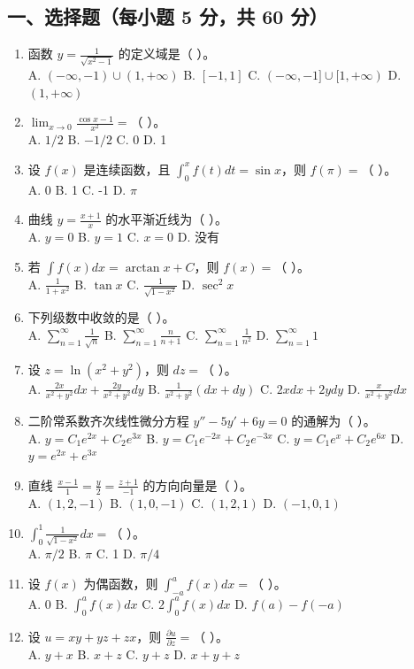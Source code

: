 \documentclass[11pt,a4paper]{article}
\begin{document}
\subsection*{一、选择题（每小题 5 分，共 60 分）}
\begin{enumerate}
    \item 函数 $y = \frac{1}{\sqrt{x^2-1}}$ 的定义域是（ ）。 \\
    A. $(-\infty, -1) \cup (1, +\infty)$ \quad B. $[-1, 1]$ \quad C. $(-\infty, -1] \cup [1, +\infty)$ \quad D. $(1, +\infty)$
    \item $\lim_{x \to 0} \frac{\cos x - 1}{x^2} = $（ ）。 \\
    A. $1/2$ \quad B. $-1/2$ \quad C. 0 \quad D. 1
    \item 设 $f(x)$ 是连续函数，且 $\int_0^x f(t) dt = \sin x$，则 $f(\pi) = $（ ）。 \\
    A. 0 \quad B. 1 \quad C. -1 \quad D. $\pi$
    \item 曲线 $y = \frac{x+1}{x}$ 的水平渐近线为（ ）。 \\
    A. $y=0$ \quad B. $y=1$ \quad C. $x=0$ \quad D. 没有
    \item 若 $\int f(x) dx = \arctan x + C$，则 $f(x) = $（ ）。 \\
    A. $\frac{1}{1+x^2}$ \quad B. $\tan x$ \quad C. $\frac{1}{\sqrt{1-x^2}}$ \quad D. $\sec^2 x$
    \item 下列级数中收敛的是（ ）。 \\
    A. $\sum_{n=1}^{\infty} \frac{1}{\sqrt{n}}$ \quad B. $\sum_{n=1}^{\infty} \frac{n}{n+1}$ \quad C. $\sum_{n=1}^{\infty} \frac{1}{n^2}$ \quad D. $\sum_{n=1}^{\infty} 1$
    \item 设 $z = \ln(x^2+y^2)$，则 $dz = $（ ）。 \\
    A. $\frac{2x}{x^2+y^2}dx + \frac{2y}{x^2+y^2}dy$ \quad B. $\frac{1}{x^2+y^2}(dx+dy)$ \quad C. $2x dx + 2y dy$ \quad D. $\frac{x}{x^2+y^2}dx$
    \item 二阶常系数齐次线性微分方程 $y'' - 5y' + 6y = 0$ 的通解为（ ）。 \\
    A. $y = C_1 e^{2x} + C_2 e^{3x}$ \quad B. $y = C_1 e^{-2x} + C_2 e^{-3x}$ \quad C. $y = C_1 e^{x} + C_2 e^{6x}$ \quad D. $y = e^{2x} + e^{3x}$
    \item 直线 $\frac{x-1}{1} = \frac{y}{2} = \frac{z+1}{-1}$ 的方向向量是（ ）。 \\
    A. $(1, 2, -1)$ \quad B. $(1, 0, -1)$ \quad C. $(1, 2, 1)$ \quad D. $(-1, 0, 1)$
    \item $\int_0^1 \frac{1}{\sqrt{1-x^2}} dx = $（ ）。 \\
    A. $\pi/2$ \quad B. $\pi$ \quad C. 1 \quad D. $\pi/4$
    \item 设 $f(x)$ 为偶函数，则 $\int_{-a}^a f(x) dx = $（ ）。 \\
    A. 0 \quad B. $\int_0^a f(x) dx$ \quad C. $2\int_0^a f(x) dx$ \quad D. $f(a)-f(-a)$
    \item 设 $u = xy + yz + zx$，则 $\frac{\partial u}{\partial z} = $（ ）。 \\
    A. $y+x$ \quad B. $x+z$ \quad C. $y+z$ \quad D. $x+y+z$
\end{enumerate}
\end{document}
